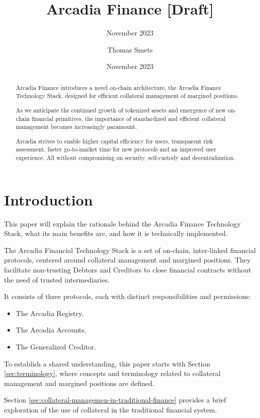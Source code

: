 \documentclass[sigconf,nonacm]{acmart}
\title{Arcadia Finance [Draft]}
\subtitle{November 2023}
\date{November 2023}
\author{Thomas Smets}
\affiliation{
    \institution{Arcadia Finance}
    \city{Brussels}
    \country{Belgium}
}
\begin{document}
\begin{abstract}
    Arcadia Finance introduces a novel on-chain architecture, the Arcadia Finance Technology Stack,
    designed for efficient collateral management of margined positions.

    As we anticipate the continued growth of tokenized assets and emergence of new on-chain financial primitives, 
    the importance of standardized and efficient collateral management becomes increasingly paramount.

    Arcadia strives to enable higher capital efficiency for users, transparent risk assessment,
    faster go-to-market time for new protocols and an improved user experience.
    All without compromising on security, self-custody and decentralization.
\end{abstract}


\maketitle

\section{Introduction} 
\label{sec:introduction}
This paper will explain the rationale behind the Arcadia Finance Technology Stack, what its main benefits are,
and how it is technically implemented.

The Arcadia Financial Technology Stack is a set of on-chain, inter-linked financial protocols,
centered around collateral management and margined positions.
They facilitate non-trusting Debtors and Creditors to close financial contracts without the need of trusted intermediaries.

It consists of three protocols, each with distinct responsibilities and permissions:
\begin{itemize}
\item The Arcadia Registry.
\item The Arcadia Accounts.
\item The Generalized Creditor.
\end{itemize}

To establish a shared understanding, this paper starts with Section \ref{sec:terminology},
where concepts and terminology related to collateral management and margined positions are defined.

Section \ref{sec:collateral-managemen-in-traditional-finance} provides a brief exploration of the use of collateral in the traditional financial system.
\end{document}
